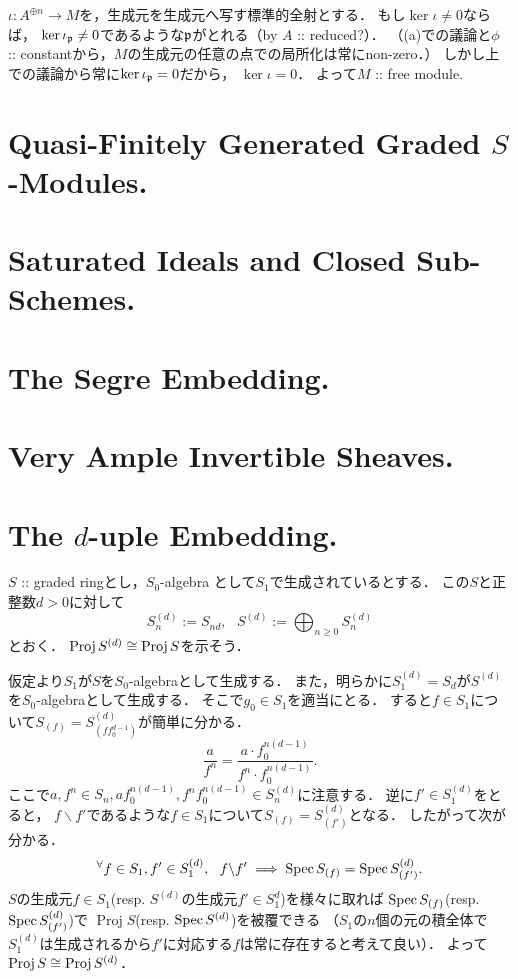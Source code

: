 \documentclass[a4paper]{jsarticle}
\newcommand{\Proj}{\operatorname{Proj}}
\begin{document}
    $\iota: A^{\oplus n} \to M$を，生成元を生成元へ写す標準的全射とする．
    もし$\ker \iota \neq 0$ならば，
    $\ker \iota_{\mathfrak{p}} \neq 0$であるような$\mathfrak{p}$がとれる（by $A$ :: reduced?）．
    （(a)での議論と$\phi$ :: constantから，$M$の生成元の任意の点での局所化は常にnon-zero．）
    しかし上での議論から常に$\ker \iota_{\mathfrak{p}}=0$だから，
    $\ker \iota=0$．
    よって$M$ :: free module.

\section{Quasi-Finitely Generated Graded $S$-Modules.} %

\section{Saturated Ideals and Closed Sub-Schemes.} %

\section{The Segre Embedding.} %

\section{Very Ample Invertible Sheaves.} %

\section{The $d$-uple Embedding.} %
    $S$ :: graded ringとし，$S_0$-algebra として$S_1$で生成されているとする．
    この$S$と正整数$d>0$に対して
    \[ S_n^{(d)}:=S_{nd},~~~ S^{(d)}:=\bigoplus_{n \geq 0} S_n^{(d)} \]
    とおく．
    $\Proj S^{(d)} \iso \Proj S$を示そう．

    仮定より$S_{1}$が$S$を$S_0$-algebraとして生成する．
    また，明らかに$S_{1}^{(d)}=S_d$が$S^{(d)}$を$S_0$-algebraとして生成する．
    そこで$g_0 \in S_1$を適当にとる．
    すると$f \in S_1$について$S_{(f)}=S_{(f f_0^{d-1})}^{(d)}$が簡単に分かる．
    \[ \frac{a}{f^n}=\frac{a \cdot f_0^{n(d-1)}}{f^n \cdot f_0^{n(d-1)}}. \]
    ここで$a, f^n \in S_n, a f_0^{n(d-1)}, f^n f_0^{n(d-1)} \in S_n^{(d)}$に注意する．
    逆に$f' \in S_1^{(d)}$をとると，
    $f \backslash f'$であるような$f \in S_1$について$S_{(f)}=S_{(f')}^{(d)}$となる．
    したがって次が分かる．
    \[ {}^{\forall} f \in S_1, f' \in S_1^{(d)},~~ f \backslash f' \implies \operatorname{Spec} S_{(f)}=\operatorname{Spec} S_{(f')}^{(d)}. \]
    $S$の生成元$f \in S_1$(resp. $S^{(d)}$の生成元$f' \in S_1^{d}$)を様々に取れば
    $\operatorname{Spec} S_{(f)}$(resp. $\operatorname{Spec} S_{(f')}^{(d)}$)で
    $\Proj S$(resp. $\operatorname{Spec} S^{(d)}$)を被覆できる
    （$S_1$の$n$個の元の積全体で$S_1^{(d)}$は生成されるから$f'$に対応する$f$は常に存在すると考えて良い）．
    よって$\Proj S \iso \Proj S^{(d)}$．
\end{document}
